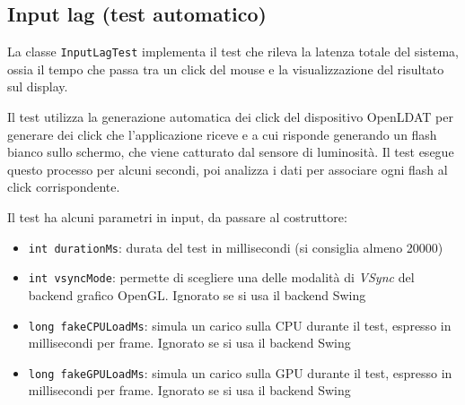 \subsection{Input lag (test automatico)}
La classe \texttt{InputLagTest} implementa il test che rileva la latenza totale del sistema, ossia il tempo che passa tra un click del mouse e la visualizzazione del risultato sul display.

Il test utilizza la generazione automatica dei click del dispositivo OpenLDAT per generare dei click che l'applicazione riceve e a cui risponde generando un flash bianco sullo schermo, che viene catturato dal sensore di luminosità. Il test esegue questo processo per alcuni secondi, poi analizza i dati per associare ogni flash al click corrispondente.

Il test ha alcuni parametri in input, da passare al costruttore:\begin{itemize}
	\item \texttt{int durationMs}: durata del test in millisecondi (si consiglia almeno 20000)
	\item \texttt{int vsyncMode}: permette di scegliere una delle modalità di \textit{VSync} del backend grafico OpenGL. Ignorato se si usa il backend Swing
	\item \texttt{long fakeCPULoadMs}: simula un carico sulla CPU durante il test, espresso in millisecondi per frame. Ignorato se si usa il backend Swing
	\item \texttt{long fakeGPULoadMs}: simula un carico sulla GPU durante il test, espresso in millisecondi per frame. Ignorato se si usa il backend Swing
\end{itemize}

